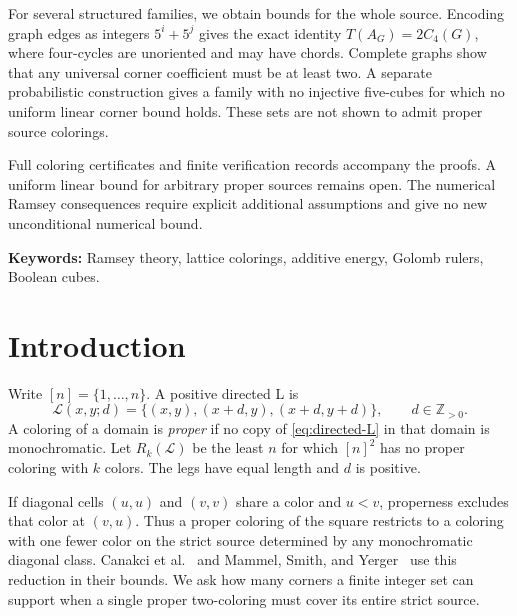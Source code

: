 \documentclass[11pt,a4paper]{article}
\newif\ifshowrevisions
\newenvironment{revision}{\par\begingroup\ifshowrevisions\color{red}\fi}{\par\endgroup}
\theoremstyle{definition}
\newcommand{\Lconf}{\mathcal L}
\newcommand{\Z}{\mathbb Z}
\numberwithin{equation}{section}
\begin{document}
\begin{revision}
For several structured families, we obtain bounds for the whole source. Encoding graph edges as integers $5^i+5^j$ gives the exact identity $T(A_G)=2C_4(G)$, where four-cycles are unoriented and may have chords. Complete graphs show that any universal corner coefficient must be at least two. A separate probabilistic construction gives a family with no injective five-cubes for which no uniform linear corner bound holds. These sets are not shown to admit proper source colorings.

Full coloring certificates and finite verification records accompany the proofs. A uniform linear bound for arbitrary proper sources remains open. The numerical Ramsey consequences require explicit additional assumptions and give no new unconditional numerical bound.
\end{revision}
\medskip
\noindent\textbf{Keywords:} Ramsey theory, lattice colorings, additive energy, Golomb rulers, Boolean cubes.
\clearpage
{}
\tableofcontents
\clearpage

\section{Introduction}\label{sec:introduction}
Write $[n]=\{1,\ldots,n\}$. A positive directed L is
\begin{equation}\label{eq:directed-L}
\Lconf(x,y;d)=\{(x,y),(x+d,y),(x+d,y+d)\},\qquad d\in\Z_{>0}.
\end{equation}
A coloring of a domain is \emph{proper} if no copy of \eqref{eq:directed-L} in that domain is monochromatic. Let $R_k(\Lconf)$ be the least $n$ for which $[n]^2$ has no proper coloring with $k$ colors. The legs have equal length and $d$ is positive.

If diagonal cells $(u,u)$ and $(v,v)$ share a color and $u<v$, properness excludes that color at $(v,u)$. Thus a proper coloring of the square restricts to a coloring with one fewer color on the strict source determined by any monochromatic diagonal class. Canakci et al.~\cite{CCFGMS23} and Mammel, Smith, and Yerger~\cite{MSY25} use this reduction in their bounds. We ask how many corners a finite integer set can support when a single proper two-coloring must cover its entire strict source.
\end{document}
